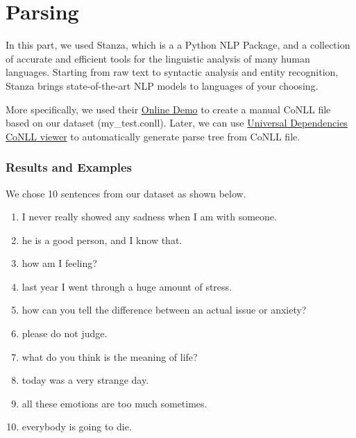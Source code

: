 \documentclass[12pt, a4paper]{article}
\begin{document}
\newpage
\part{Parsing}
In this part, we used Stanza, which is a a Python NLP Package, and a collection of accurate and efficient tools for the linguistic analysis of many human languages. Starting from raw text to syntactic analysis and entity recognition, Stanza brings state-of-the-art NLP models to languages of your choosing.

More specifically, we used their \href{http://stanza.run/}{Online Demo} to create a manual CoNLL file based on our dataset (my\_test.conll). Later, we can use \href{https://universaldependencies.org/conllu_viewer.html}{Universal Dependencies CoNLL viewer} to automatically generate parse tree from CoNLL file.

\section*{Results and Examples}
We chose 10 sentences from our dataset as shown below.
\begin{enumerate}
	\item I never really showed any sadness when I am with someone.
	\item he is a good person, and I know that.
	\item how am I feeling?
	\item last year I went through a huge amount of stress.
	\item how can you tell the difference between an actual issue or anxiety?
	\item please do not judge.
	\item what do you think is the meaning of life?
	\item today was a very strange day.
	\item all these emotions are too much sometimes. 
	\item everybody is going to die.
\end{enumerate}
\end{document}
